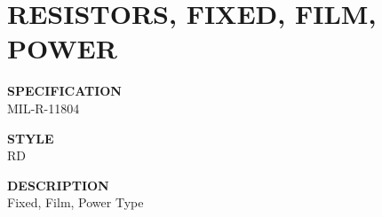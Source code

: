 \section{RESISTORS, FIXED, FILM, POWER}

\begin{minipage}[t]{0.24\textwidth}
    \textbf{SPECIFICATION}\\
    MIL-R-11804
\end{minipage}
\hfill
\begin{minipage}[t]{0.24\textwidth}
    \textbf{STYLE}\\
    RD
\end{minipage}
\hfill
\begin{minipage}[t]{0.49\textwidth}
    \textbf{DESCRIPTION}\\
    Fixed, Film, Power Type
\end{minipage}

